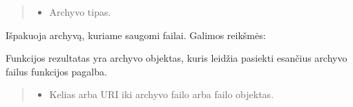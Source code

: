 \documentclass[letterpaper,10pt,lithuanian]{sphinxmanual}
\begin{document}
\begin{fulllineitems}
\begin{fulllineitems}
\begin{quote}
\begin{description}
\begin{itemize}
\item {} 
\sphinxAtStartPar
{} \sphinxhyphen{}\sphinxhyphen{} Archyvo tipas.

\end{itemize}

\end{description}\end{quote}

\sphinxAtStartPar
Išpakuoja archyvą, kuriame saugomi failai. Galimos  reikšmės:


\begin{fulllineitems}

\pysigstartsignatures
\pysigline
{}
\pysigstopsignatures
\end{fulllineitems}



\begin{fulllineitems}

\pysigstartsignatures
\pysigline
{}
\pysigstopsignatures
\end{fulllineitems}



\begin{fulllineitems}

\pysigstartsignatures
\pysigline
{}
\pysigstopsignatures
\end{fulllineitems}


\sphinxAtStartPar
Funkcijos rezultatas yra archyvo objektas, kuris leidžia pasiekti
esančius archyvo failus {\hyperref[\detokenize{formules:id22}]{}} funkcijos pagalba.

\end{fulllineitems}


\begin{fulllineitems}
\label{\detokenize{formules:decompress}}
\pysigstartsignatures
\pysiglinewithargsret
{}
{\sphinxparamcomma {}}
{}
\pysigstopsignatures\begin{quote}\begin{description}
\begin{itemize}
\item {} 
\sphinxAtStartPar
{} \sphinxhyphen{}\sphinxhyphen{} Kelias arba URI iki archyvo failo arba failo objektas.


\end{itemize}
\end{description}
\end{quote}
\end{fulllineitems}
\end{fulllineitems}
\end{document}
